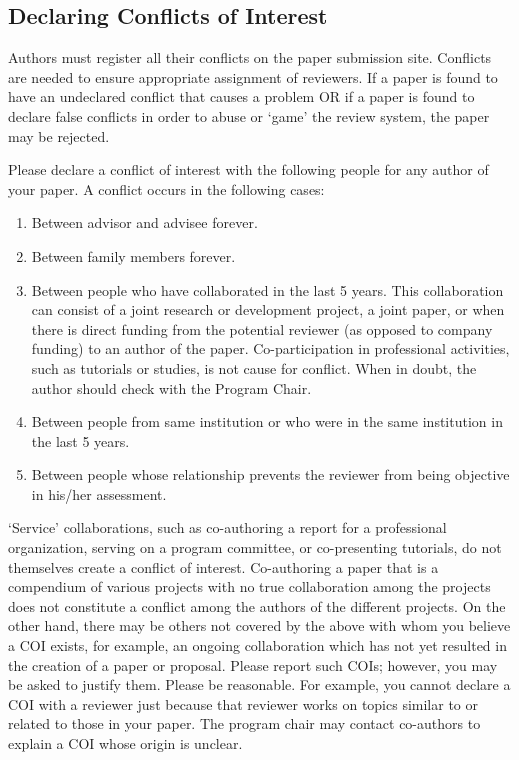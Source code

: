 \documentclass[conference]{IEEEtran}
\begin{document}
\subsection{Declaring Conflicts of Interest}

Authors must register all their conflicts on the paper submission
site. Conflicts are needed to ensure appropriate assignment of
reviewers. If a paper is found to have an undeclared conflict that
causes a problem OR if a paper is found to declare false conflicts in
order to abuse or `game' the review system, the paper may be rejected.

Please declare a conflict of interest with the following people for any author of your paper.
A conflict occurs in the following cases:
\begin{enumerate}
\item Between advisor and advisee forever.
\item Between family members forever.
\item Between people who have collaborated in the last 5 years. This
  collaboration can consist of a joint research or development
  project, a joint paper, or when there is direct funding from the
  potential reviewer (as opposed to company funding) to an author of
  the paper. Co-participation in professional activities, such as
  tutorials or studies, is not cause for conflict. When in doubt, the
  author should check with the Program Chair.
\item Between people from same institution or who were in the same
  institution in the last 5 years.
\item Between people whose relationship prevents the reviewer from
  being objective in his/her assessment.
\end{enumerate}

`Service' collaborations, such as co-authoring a report for a
professional organization, serving on a program committee, or
co-presenting tutorials, do not themselves create a conflict of
interest. Co-authoring a paper that is a compendium of various
projects with no true collaboration among the projects does not
constitute a conflict among the authors of the different projects. On
the other hand, there may be others not covered by the above with whom
you believe a COI exists, for example, an ongoing collaboration which
has not yet resulted in the creation of a paper or proposal. Please
report such COIs; however, you may be asked to justify them. Please be
reasonable. For example, you cannot declare a COI with a reviewer just
because that reviewer works on topics similar to or related to those
in your paper.  The program chair may contact co-authors to explain a COI
whose origin is unclear.
\end{document}
